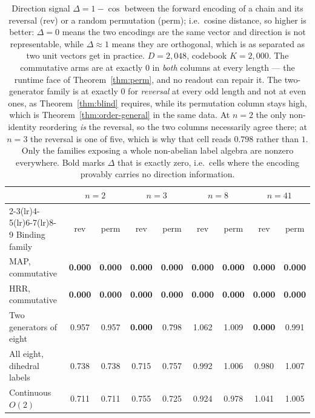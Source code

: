 \documentclass[10pt]{article}
\begin{document}
\begin{table}[t]
\centering
\caption{Direction signal $\Delta = 1 - \cos$ between the forward encoding of a chain and its reversal (rev) or a random permutation (perm); i.e.\ cosine distance, so higher is better: $\Delta = 0$ means the two encodings are the same vector and direction is not representable, while $\Delta \approx 1$ means they are orthogonal, which is as separated as two unit vectors get in practice. $D = 2{,}048$, codebook $K = 2{,}000$. The commutative arms are at exactly $0$ in \emph{both} columns at every length --- the runtime face of Theorem~\ref{thm:perm}, and no readout can repair it. The two-generator family is at exactly $0$ for \emph{reversal} at every odd length and not at even ones, as Theorem~\ref{thm:blind} requires, while its permutation column stays high, which is Theorem~\ref{thm:order-general} in the same data. At $n = 2$ the only non-identity reordering \emph{is} the reversal, so the two columns necessarily agree there; at $n = 3$ the reversal is one of five, which is why that cell reads $0.798$ rather than $1$. Only the families exposing a whole non-abelian label algebra are nonzero everywhere. Bold marks $\Delta$ that is exactly zero, i.e.\ cells where the encoding provably carries no direction information.}
\label{tab:reversal}
\small
\begin{tabular}{lcccccccc}
\toprule
& \multicolumn{2}{c}{$n = 2$} & \multicolumn{2}{c}{$n = 3$} & \multicolumn{2}{c}{$n = 8$} & \multicolumn{2}{c}{$n = 41$} \\
\cmidrule(lr){2-3}\cmidrule(lr){4-5}\cmidrule(lr){6-7}\cmidrule(lr){8-9}
Binding family & rev & perm & rev & perm & rev & perm & rev & perm \\
\midrule
MAP, commutative              & \textbf{0.000} & \textbf{0.000} & \textbf{0.000} & \textbf{0.000} & \textbf{0.000} & \textbf{0.000} & \textbf{0.000} & \textbf{0.000} \\
HRR, commutative              & \textbf{0.000} & \textbf{0.000} & \textbf{0.000} & \textbf{0.000} & \textbf{0.000} & \textbf{0.000} & \textbf{0.000} & \textbf{0.000} \\
Two generators of eight       & 0.957 & 0.957 & \textbf{0.000} & 0.798 & 1.062 & 1.009 & \textbf{0.000} & 0.991 \\
All eight, dihedral labels    & 0.738 & 0.738 & 0.715 & 0.757 & 0.992 & 1.006 & 0.980 & 1.007 \\
Continuous $O(2)$             & 0.711 & 0.711 & 0.755 & 0.725 & 0.924 & 0.978 & 1.041 & 1.005 \\
\bottomrule
\end{tabular}
\end{table}
\end{document}
